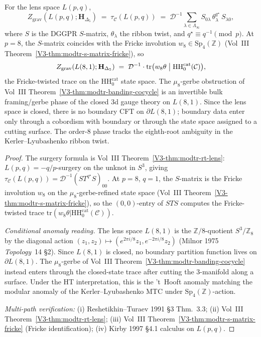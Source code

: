 \begin{theorem}
\label{thm:thqghr-rt-lens}
For the lens space $L(p, q)$,
\[
 Z_{\mathrm{grav}}(L(p, q); \mathbf H_{\Delta_5})
 \;=\;
 \tau_{\mathcal C}(L(p, q))
 \;=\;
 \mathcal D^{-1}\sum_{\lambda\in\Lambda_\infty}
 S_{0\lambda}\,\theta_\lambda^{q^\star}\,S_{\lambda 0},
\]
where $S$ is the DGGPR $S$-matrix, $\theta_\lambda$ the ribbon twist,
and $q^\star\equiv q^{-1}\pmod p$. At $p = 8$, the $S$-matrix coincides
with the Fricke involution $w_8\in\mathrm{Sp}_4(\mathbb Z)$ (Vol~III
Theorem~\ref{V3-thm:modtr-s-matrix-fricke}), so
\[
 Z_{\mathrm{grav}}(L(8, 1); \mathbf H_{\Delta_5})
 \;=\;
 \mathcal D^{-1}\cdot\mathrm{tr}\bigl(w_8\theta\bigm\vert
 \mathrm{HH}_0^{\mathrm{cat}}(\mathcal C)\bigr),
\]
the Fricke-twisted trace on the $\mathrm{HH}_0^{\mathrm{cat}}$ state
space. The $\mu_8$-gerbe obstruction of Vol~III
Theorem~\ref{V3-thm:modtr-banding-cocycle} is an invertible bulk
framing/gerbe phase of the closed 3d gauge theory on $L(8, 1)$. Since
the lens space is closed, there is no boundary CFT on
$\partial L(8,1)$; boundary data enter only through a cobordism with
boundary or through the state space assigned to a cutting surface. The
order-$8$ phase tracks the eighth-root ambiguity in the
Kerler--Lyubashenko ribbon twist.
\end{theorem}

\begin{proof}
The surgery formula is Vol~III Theorem~\ref{V3-thm:modtr-rt-lens}:
$L(p, q) = -q/p$-surgery on the unknot in $S^3$, giving
$\tau_{\mathcal C}(L(p, q)) = \mathcal D^{-1}(ST^{q^\star}S)_{00}$.
At $p = 8$, $q = 1$, the $S$-matrix is the Fricke involution
$w_8$ on the $\mu_8$-gerbe-refined state space (Vol~III
Theorem~\ref{V3-thm:modtr-s-matrix-fricke}), so the $(0, 0)$-entry
of $STS$ computes the Fricke-twisted trace
$\mathrm{tr}(w_8\theta|\mathrm{HH}_0^{\mathrm{cat}}(\mathcal C))$.

\emph{Conditional anomaly reading.} The lens space $L(8, 1)$ is the
$\mathbb Z/8$-quotient $S^3/\mathbb Z_8$ by the diagonal action
$(z_1, z_2)\mapsto(e^{2\pi i/8}z_1, e^{-2\pi i/8}z_2)$
(Milnor 1975 \emph{Topology}~14 \S 2). Since $L(8,1)$ is closed, no
boundary partition function lives on $\partial L(8,1)$. The
$\mu_8$-gerbe of Vol~III Theorem~\ref{V3-thm:modtr-banding-cocycle}
instead enters through the closed-state trace after cutting the
3-manifold along a surface. Under the HT interpretation, this is the
't~Hooft anomaly matching the modular anomaly of the
Kerler--Lyubashenko MTC under
$\mathrm{Sp}_4(\mathbb Z)$-action.

\emph{Multi-path verification:}
(i) Reshetikhin--Turaev 1991 \S 3 Thm.~3.3;
(ii) Vol~III Theorem~\ref{V3-thm:modtr-rt-lens};
(iii) Vol~III Theorem~\ref{V3-thm:modtr-s-matrix-fricke} (Fricke identification);
(iv) Kirby 1997 \S 4.1 calculus on $L(p, q)$.
\end{proof}

